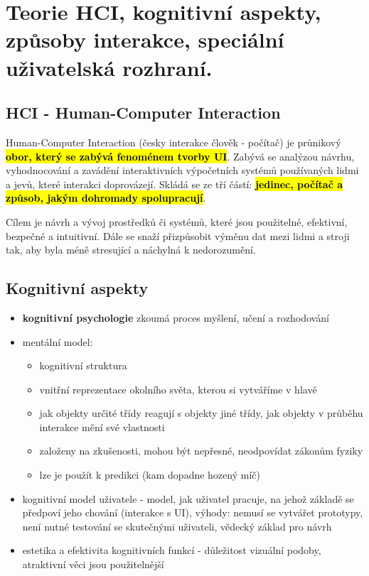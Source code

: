 \section[NUR - Teorie HCI]{Teorie HCI, kognitivní aspekty, způsoby interakce, speciální uživatelská rozhraní.}
\subsection{HCI - Human-Computer Interaction}

Human-Computer Interaction (česky interakce člověk - počítač) je průnikový \hl{\textbf{obor, který se zabývá fenoménem tvorby UI}}. Zabývá se analýzou návrhu, vyhodnocování a zavádění interaktivních výpočetních systémů používaných lidmi a jevů, které interakci doprovázejí. Skládá se ze tří částí: \hl{\textbf{jedinec, počítač a způsob, jakým dohromady spolupracují}}.

Cílem je návrh a vývoj prostředků či systémů, které jsou použitelné, efektivní, bezpečné a intuitivní. Dále se snaží přizpůsobit výměnu dat mezi lidmi a stroji tak, aby byla méně stresující a náchylná k nedorozumění.

\subsection{Kognitivní aspekty}
\begin{itemize}[itemsep=0px]
\item \textbf{kognitivní psychologie} zkoumá proces myšlení, učení a rozhodování
\item mentální model:
    \begin{itemize}[itemsep=0px]
    \item kognitivní struktura
    \item vnitřní reprezentace okolního světa, kterou si vytváříme v hlavě
    \item jak objekty určité třídy reagují s objekty jiné třídy, jak objekty v průběhu interakce mění své vlastnosti
    \item založeny na zkušenosti, mohou být nepřesné, neodpovídat zákonům fyziky
    \item lze je použít k predikci (kam dopadne hozený míč)
    \end{itemize}
\item kognitivní model uživatele - model, jak uživatel pracuje, na jehož základě se předpoví jeho chování (interakce s UI), výhody: nemusí se vytvářet prototypy, není nutné testování se skutečnými uživateli, vědecký základ pro návrh
\item estetika a efektivita kognitivních funkcí - důležitost vizuální podoby, atraktivní věci jsou použitelnější
\end{itemize}

